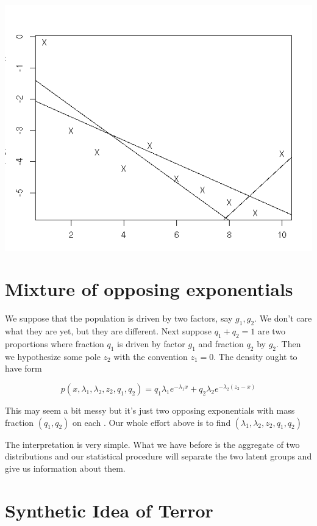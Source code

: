 \documentclass{amsart}
\begin{document}
\includegraphics[scale=0.8]{logv.jpeg}

\section{Mixture of opposing exponentials}

We suppose that the population is driven by two factors, say $g_1,g_2$.  We don't care what they are yet, but they are different.  
Next suppose $q_1+q_2=1$ are two proportions where fraction $q_1$ is driven by factor $g_1$ and fraction $q_2$ by $g_2$.  Then we hypothesize some pole $z_2$ with the convention $z_1=0$.  The density ought to have form

\begin{equation}
p(x, \lambda_1,\lambda_2, z_2, q_1, q_2) = q_1 \lambda_1 e^{-\lambda_1 x} + q_2 \lambda_2 e^{-\lambda_2(z_2 - x)}
\end{equation}

This may seem a bit messy but it's just two opposing exponentials with mass fraction $(q_1, q_2)$ on each .  Our whole effort above is to find $(\lambda_1, \lambda_2, z_2, q_1,q_2)$

The interpretation is very simple.  What we have before is the aggregate of two distributions and our statistical procedure will separate the two latent groups and give us information about them.


\section{Synthetic Idea of Terror}
\end{document}
